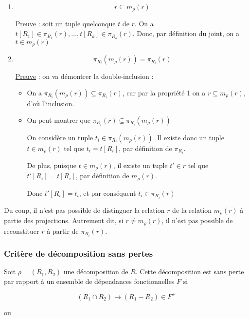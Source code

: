 			\begin{enumerate}
				\item 
				$$r \subseteq m_{\rho}(r)$$
				
				
				\underline{Preuve} : soit un tuple quelconque $t$ de $r$. On a $t[R_1] \in \pi_{R_1}(r), \dots , t[R_k] \in \pi_{R_k}(r)$. Donc, par définition du joint, on a $t \in m_{\rho}(r)$
				
				\item 
				
				$$\pi_{R_i} (m_{\rho}(r)) = \pi_{R_i}(r)$$
				
				\underline{Preuve} : on va démontrer la double-inclusion :
				
				\begin{itemize}
					\item On a $\pi_{R_i} (m_{\rho}(r)) \subseteq \pi_{R_i}(r)$, car par la propriété 1 on a $r \subseteq m_{\rho}(r)$, d'où l'inclusion.
					\item On peut montrer que $\pi_{R_i}(r) \subseteq \pi_{R_i} (m_{\rho}(r))$
					
					On considère un tuple $t_i \in \pi_{R_i}(m_{\rho}(r))$. Il existe donc un tuple $t \in m_{\rho}(r)$ tel que $t_i = t[R_i]$, par définition de $\pi_{R_i}$. 
					
					De plus, puisque $t \in m_{\rho}(r)$, il existe un tuple $t' \in r$ tel que $t'[R_i] = t[R_i]$, par définition de $m_{\rho}(r)$.
					
					Donc $t'[R_i] = t_i$, et par conséquent $t_i \in \pi_{R_i}(r)$
				\end{itemize}
		\end{enumerate}
		Du coup, il n'est pas possible de distinguer la relation $r$  de la relation $m_{\rho}(r)$ à partie des projections. Autrement dit, si $r \neq m_{\rho}(r)$, il n'est pas possible de reconstituer $r$ à partir de $\pi_{R_i}(r)$.
		
			\subsubsection{Critère de décomposition sans pertes}
			
			Soit $\rho = (R_1, R_2)$ une décomposition de $R$. Cette décomposition est sans perte par rapport à un ensemble de dépendances fonctionnelles $F$ si
			
			$$(R_1 \cap R_2) \rightarrow (R_1 - R_2) \in F^+$$
			
			ou
			
